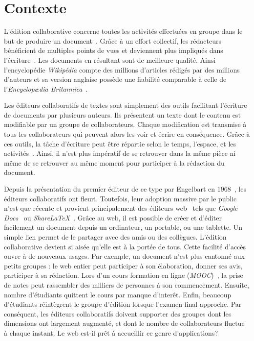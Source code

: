 
\section{Contexte}

\lettrine{L}'édition collaborative concerne toutes les activités effectuées en
groupe dans le but de produire un document~\cite{ellis1989concurrency,
  johansen1988groupware}. Grâce à un effort collectif, les rédacteurs
bénéficient de multiples points de vues et deviennent plus impliqués dans
l'écriture~\cite{noel2004empirical}. Les documents en résultant sont de
meilleure qualité. Ainsi l'encyclopédie \emph{Wikipédia} compte des millions
d'articles rédigés par des millions d'auteurs et sa version anglaise possède une
fiabilité comparable à celle de l'\emph{Encyclopædia
  Britannica}~\cite{giles2005internet}.

Les éditeurs collaboratifs de textes sont simplement des outils facilitant
l'écriture de documents par plusieurs auteurs. Ils présentent un texte dont le
contenu est modifiable par un groupe de collaborateurs. Chaque modification est
transmise à tous les collaborateurs qui peuvent alors les voir et écrire en
conséquence. Grâce à ces outils, la tâche d'écriture peut être répartie selon le
temps, l'espace, et les activités~\cite{desanctis1987foundation,
  grudin1994computersupported, johansen1988groupware}. Ainsi, il n'est plus
impératif de se retrouver dans la même pièce ni même de se retrouver au même
moment pour participer à la rédaction du document.

Depuis la présentation du premier éditeur de ce type par Engelbart en
1968~\cite{engelbart1968research}, les éditeurs collaboratifs ont
fleuri. Toutefois, leur adoption massive par le public n'est que récente et
provient principalement des éditeurs web~\cite{mogan2010impact,
  perkel2014scientific} tels que \emph{Google Docs}~\cite{googledocs} ou
\emph{ShareLaTeX}~\cite{sharelatex}. Grâce au web, il est possible de créer et
d'éditer facilement un document depuis un ordinateur, un portable, ou une
tablette. Un simple lien permet de le partager avec des amis ou des
collègues. L'édition collaborative devient si aisée qu'elle est à la portée de
tous. Cette facilité d'accès ouvre à de nouveaux usages. Par exemple, un
document n'est plus cantonné aux petits groupes : le web entier peut participer
à son élaboration, donner ses avis, participer à sa rédaction. Lors d'un cours
formation en ligne (\emph{MOOC})~\cite{breslow2013studying}, la prise de notes
peut rassembler des milliers de personnes à son commencement. Ensuite, nombre
d'étudiants quittent le cours par manque d'interêt. Enfin, beaucoup d'étudiants
réintègrent le groupe d'édition lorsque l'examen final approche.  Par
conséquent, les éditeurs collaboratifs doivent supporter des groupes dont les
dimensions ont largement augmenté, et dont le nombre de collaborateurs fluctue à
chaque instant. Le web est-il prêt à accueillir ce genre d'applications?

